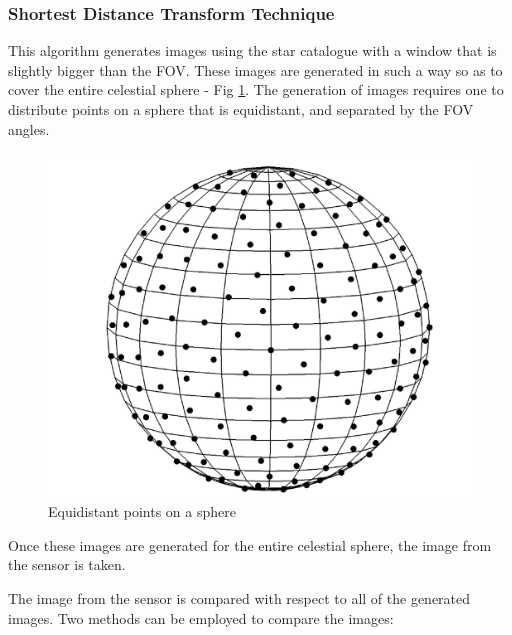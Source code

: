\subsubsection{Shortest Distance Transform Technique}

This algorithm \cite{delabie2013highly} generates images using the star catalogue with a window that is slightly bigger than the FOV. These images are generated in such a way so as to cover the entire celestial sphere - Fig \ref{fig:sphere}. 
The generation of images requires one to distribute points on a sphere that is equidistant, and separated by the FOV angles.

\begin{figure}[h]
    \centering
    \includegraphics[scale = 0.25]{Figures/GNC/shortest_dist_sphere.png}
    \caption{Equidistant points on a sphere}
    \label{fig:sphere}
\end{figure}
Once these images are generated for the entire celestial sphere, the image from the sensor is taken.

The image from the sensor is compared with respect to all of the generated images. Two methods can be employed to compare the images:

